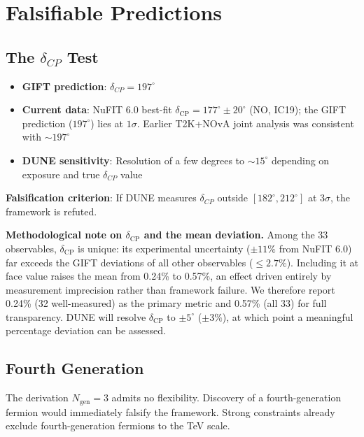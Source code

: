 \documentclass[11pt,a4paper]{article}
\newcommand{\CP}{\mathrm{CP}}
\def\CP{CP}%
\begin{document}
\section{Falsifiable Predictions}

\subsection{The $\delta_{\CP}$ Test}

\begin{itemize}
\item \textbf{GIFT prediction}: $\delta_{\CP} = 197^\circ$
\item \textbf{Current data}: NuFIT 6.0 best-fit $\delta_{\mathrm{CP}} = 177^\circ \pm 20^\circ$ (NO, IC19); the GIFT prediction ($197^\circ$) lies at $1\sigma$. Earlier T2K+NOvA joint analysis was consistent with ${\sim}197^\circ$~\cite{t2knova2025}
\item \textbf{DUNE sensitivity}: Resolution of a few degrees to $\sim 15^\circ$ depending on exposure and true $\delta_{\CP}$ value~\cite{dune2020,dune2021}
\end{itemize}

\textbf{Falsification criterion}: If DUNE measures $\delta_{\CP}$ outside $[182^\circ, 212^\circ]$ at $3\sigma$, the framework is refuted.

\textbf{Methodological note on $\delta_{\mathrm{CP}}$ and the mean deviation.} Among the 33 observables, $\delta_{\mathrm{CP}}$ is unique: its experimental uncertainty ($\pm 11\%$ from NuFIT 6.0) far exceeds the GIFT deviations of all other observables ($\leq 2.7\%$). Including it at face value raises the mean from 0.24\% to 0.57\%, an effect driven entirely by measurement imprecision rather than framework failure. We therefore report 0.24\% (32 well-measured) as the primary metric and 0.57\% (all 33) for full transparency. DUNE will resolve $\delta_{\mathrm{CP}}$ to $\pm 5^\circ$ ($\pm 3\%$), at which point a meaningful percentage deviation can be assessed.

\subsection{Fourth Generation}

The derivation $N_{\mathrm{gen}} = 3$ admits no flexibility. Discovery of a fourth-generation fermion would immediately falsify the framework. Strong constraints already exclude fourth-generation fermions to the TeV scale.
\end{document}
